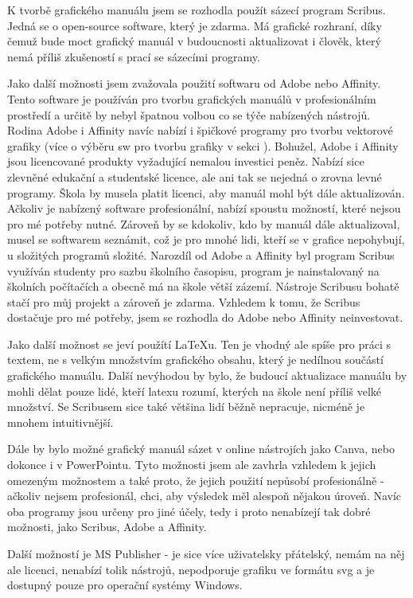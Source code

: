 \documentclass[11pt,a4paper,twoside,openright]{report}
\begin{document}
\label{sec:manual}
K tvorbě grafického manuálu jsem se rozhodla použít sázecí program Scribus. Jedná se o open-source software, který je zdarma. Má grafické rozhraní, díky čemuž bude moct grafický manuál v budoucnosti aktualizovat i člověk, který nemá příliš zkušeností s prací se sázecími programy.

Jako další možnosti jsem zvažovala použití softwaru od Adobe nebo Affinity. Tento software je používán pro tvorbu grafických manuálů v profesionálním prostředí a určitě by nebyl špatnou volbou co se týče nabízených nástrojů. Rodina Adobe i Affinity navíc nabízí i špičkové programy pro tvorbu vektorové grafiky (více o výběru sw pro tvorbu grafiky v sekci ). Bohužel, Adobe i Affinity jsou licencované produkty vyžadující nemalou investici peněz. Nabízí sice zlevněné edukační a studentské licence, ale ani tak se nejedná o zrovna levné programy. Škola by musela platit licenci, aby manuál mohl být dále aktualizován. Ačkoliv je nabízený software profesionální, nabízí spoustu možností, které nejsou pro mé potřeby nutné. Zároveň by se kdokoliv, kdo by manuál dále aktualizoval, musel se softwarem seznámit, což je pro mnohé lidi, kteří se v grafice nepohybují, u složitých programů složité. Narozdíl od Adobe a Affinity byl program Scribus využíván studenty pro sazbu školního časopisu, program je nainstalovaný na školních počítačích a obecně má na škole větší zázemí. Nástroje Scribusu bohatě stačí pro můj projekt a zároveň je zdarma. Vzhledem k tomu, že Scribus dostačuje pro mé potřeby, jsem se rozhodla do Adobe nebo Affinity neinvestovat.

Jako další možnost se jeví použítí LaTeXu. Ten je vhodný ale spíše pro práci s textem, ne s velkým množstvím grafického obsahu, který je nedílnou součástí grafického manuálu. Další nevýhodou by bylo, že budoucí aktualizace manuálu by mohli dělat pouze lidé, kteří latexu rozumí, kterých na škole není příliš velké množství. Se Scribusem sice také většina lidí běžně nepracuje, nicméně je mnohem intuitivnější.

Dále by bylo možné grafický manuál sázet v online nástrojích jako Canva, nebo dokonce i v PowerPointu. Tyto možnosti jsem ale zavhrla vzhledem k jejich omezeným možnostem a také proto, že jejich použití nepůsobí profesionálně - ačkoliv nejsem profesionál, chci, aby výsledek měl alespoň nějakou úroveň. Navíc oba programy jsou určeny pro jiné účely, tedy i proto nenabízejí tak dobré možnosti, jako Scribus, Adobe a Affinity.

Další možností je MS Publisher - je sice více uživatelsky přátelský, nemám na něj ale licenci, nenabízí tolik nástrojů, nepodporuje grafiku ve formátu svg a je dostupný pouze pro operační systémy Windows. 
\end{document}
